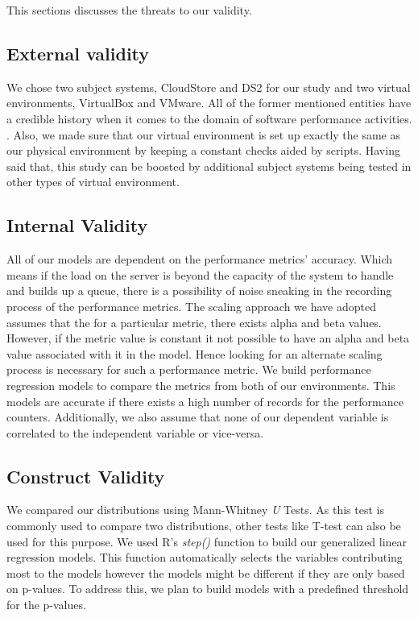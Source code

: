 This sections discusses the threats to our validity.
\subsection{External validity}
We chose two subject systems, CloudStore and DS2 for our study and two virtual environments, VirtualBox and VMware. All of the former mentioned entities have a credible history when it comes to the domain of software performance activities. \cite{5306331} \cite{Nguyen:2012:ADP:2188286.2188344}. Also, we made sure that our virtual environment is set up exactly the same as our physical environment by keeping a constant checks aided by scripts. Having said that, this study can be boosted by additional subject systems being tested in other types of virtual environment. 

\subsection{Internal Validity}

All of our models are dependent on the performance metrics' accuracy. Which means if the load on the server is beyond the capacity of the system to handle and builds up a queue, there is a possibility of noise sneaking in the recording process of the performance metrics. 
The scaling approach we have adopted assumes that the for a particular metric, there exists alpha and beta values. However, if the metric value is constant it not possible to have an alpha and beta value associated with it in the model. Hence looking for an alternate scaling process is necessary for such a performance metric.
We build performance regression models to compare the metrics from both of our environments. This models are accurate if there exists a high number of records for the performance counters. Additionally, we also assume that none of our dependent variable is correlated to the independent variable or vice-versa. 

\subsection{Construct Validity}
We compared our distributions using Mann-Whitney \textit{U} Tests. As this test is commonly used to compare two distributions, other tests like T-test can also be used for this purpose. 
We used R's \textit{step()} function to build our generalized linear regression models. This function automatically selects the variables contributing most to the models however the models might be different if they are only based on p-values. To address this, we plan to build models with a predefined threshold for the p-values.
